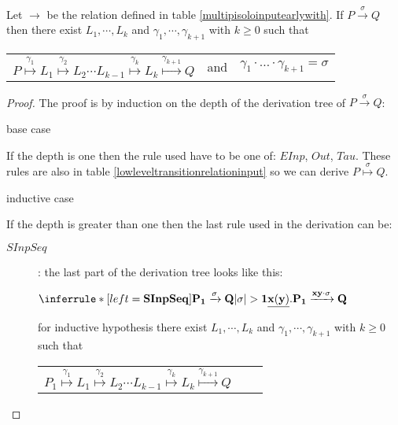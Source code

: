 \begin{proposition}\label{equivalencehightolowinput}
  Let $\rightarrow$ be the relation defined in table \ref{multipisoloinputearlywith}. If $P\xrightarrow{\sigma} Q$ then there exist $L_{1}, \cdots, L_{k}$ and $\gamma_{1}, \cdots, \gamma_{k+1}$ with $k\geq 0$ such that 
  \begin{center}
    \begin{tabular}{lll}
      $P \stackrel{\gamma_{1}}{\longmapsto} L_{1}  \stackrel{\gamma_{2}}{\longmapsto} L_{2} \cdots L_{k-1} \stackrel{\gamma_{k}}{\longmapsto} L_{k} \stackrel{\gamma_{k+1}}{\longmapsto} Q$ 
    &
      and
    &
      $\gamma_{1} \cdot \ldots \cdot \gamma_{k+1} = \sigma$  
    \end{tabular}
  \end{center}
  \begin{proof}
    The proof is by induction on the depth of the derivation tree of $P\xrightarrow{\sigma} Q$:
    \begin{description}
      \item[base case]
    \end{description}
	If the depth is one then the rule used have to be one of: $EInp$, $Out$, $Tau$. These rules are also in table \ref{lowleveltransitionrelationinput} so we can derive $P \stackrel{\sigma}{\longmapsto}Q$.
    \begin{description}
      \item[inductive case]
    \end{description}
	If the depth is greater than one then the last rule used in the derivation can be:
	\begin{description}
	  \item[$SInpSeq$]: 
	    the last part of the derivation tree looks like this:
	    \begin{center}
	      $\inferrule* [left=\bf{SInpSeq}]{
		  P_{1} \xrightarrow{\sigma} Q
		\\
		  |\sigma|>1
	      }{
		\underline{x(y)}.P_{1} \xrightarrow{xy \cdot \sigma} Q
	      }$	      
	    \end{center}
	    for inductive hypothesis there exist $L_{1}, \cdots, L_{k}$ and $\gamma_{1}, \cdots, \gamma_{k+1}$ with $k\geq 0$ such that 
	    \begin{center}
	      \begin{tabular}{lll}
		$P_{1} \stackrel{\gamma_{1}}{\longmapsto} L_{1} \stackrel{\gamma_{2}}{\longmapsto} L_{2} \cdots L_{k-1} \stackrel{\gamma_{k}}{\longmapsto} L_{k} \stackrel{\gamma_{k+1}}{\longmapsto} Q$ 

\end{tabular}
\end{center}
\end{description}
\end{proof}
\end{proposition}
